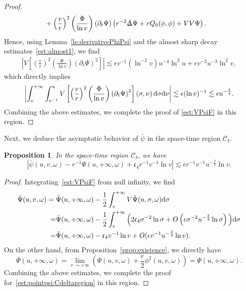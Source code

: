 \documentclass[a4paper,reqno]{amsart}
\newtheorem{proposition}[theorem]{Proposition}
\theoremstyle{definition}
\numberwithin{equation}{section}
\def \d {{\rm{d}}}
\def \pt{\partial_{t}}
\def\Deltas{\slashed{\Delta}}
\def\ep{\epsilon}
\def\de{\delta}
\begin{document}
\begin{proof}
\begin{equation*}
\begin{aligned}
&+\left(\frac{v}{r}\right)^{2}\left(\frac{\Phi}{\ln v}\right)\left(\pt \Psi\right)
\left(r^{-2}\Deltas \Psi+rQ_{0}(\phi,\phi)+VV\Psi\right).
\end{aligned}
\end{equation*}
Hence, using Lemma~\ref{le:derivativePhiPsi} and the almost sharp decay estimates~\eqref{est:almost1}, we find 
\begin{equation*}
\begin{aligned}
\left|V\left[\left(\frac{v}{r}\right)^{2}\left(\frac{\Phi}{\ln v}\right)\left(\pt \Psi\right)^{2}\right]\right|
\lesssim \ep v^{-1}(\ln^{-2}v)u^{-4}\ln^2u+\ep v^{-2}u^{-3}\ln^{2}v,
\end{aligned}
\end{equation*}
which directly implies
\begin{equation*}
\left|\int_{v}^{+\infty}\int_{v^{-1}}^{u}V\left[\left(\frac{v}{r}\right)^{2}\left(\frac{\Phi}{\ln v}\right)\left(\pt \Psi\right)^{2}\right]\left(\sigma,\nu\right)\d \sigma \d \nu\right|\lesssim \ep (\ln v)^{-1}\lesssim \ep u^{-\frac{\delta}{4}}.
\end{equation*}
Combining the above estimates, we complete the proof of \eqref{est:VPsiF} in this region.
\end{proof}

Next, we deduce the asymptotic behavior of $\bar{\psi}$ in the space-time region $\mathcal{C}_{\delta}$.

\begin{proposition}\label{prop:psi}
In the space-time region $\mathcal{C}_{\delta}$, we have 
    \begin{equation}\label{est:pointpsi:Cdeltaregion}
        \left|\bar{\psi}(u,v,\omega)-r^{-1}{\Psi}(u,+\infty,\omega)+\mathfrak{c}_{4}r^{-1}v^{-1}\ln v\right|\lesssim \ep r^{-1}v^{-1}u^{-\frac{\delta}{4}}\ln v.
    \end{equation}
\end{proposition}

\begin{proof}
Integrating~\eqref{est:VPsiF} from null infinity, we find 
\begin{align*}
\bar{\Psi}(u,v,\omega)={}&\bar{\Psi}(u,+\infty,\omega) -\frac{1}{2}\int_{v}^{+\infty} V\bar{\Psi} (u,\sigma,\omega) \d\sigma\notag\\
=&\bar{\Psi}(u,+\infty,\omega)- \frac{1}{2}\int_{v}^{+\infty} \Big(2\mathfrak{c}_{4}\sigma^{-2}\ln \sigma +O\left(\ep \sigma^{-2} u^{-\frac{\delta}{4}}\ln \sigma\right)\Big) \d\sigma\notag\\
=&\bar{\Psi}(u,+\infty,\omega) -\mathfrak{c}_{4} v^{-1}\ln v + 
O(\ep v^{-1}u^{-\frac{\de}{4}}\ln v).
\end{align*}
On the other hand, from Proposition~\ref{prop:existence}, we directly have 
\begin{equation*}
    \bar\Psi(u,+\infty,\omega)=\lim_{v\to +\infty}\left(\Psi(u,v,\omega)+\frac{r}{2}\phi^{2}(u,v,\omega)\right)=\Psi(u,+\infty,\omega).
\end{equation*}
Combining the above estimates, we complete the proof for~\eqref{est:pointpsi:Cdeltaregion} in this region.
\end{proof}
\end{document}
